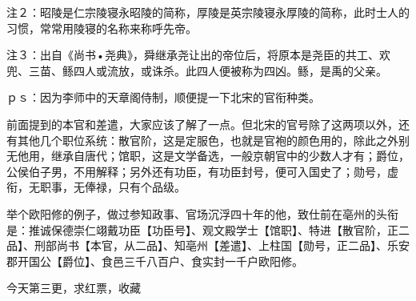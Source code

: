 注２：昭陵是仁宗陵寝永昭陵的简称，厚陵是英宗陵寝永厚陵的简称，此时士人的习惯，常常用陵寝的名称来称呼先帝。

注３：出自《尚书•尧典》，舜继承尧让出的帝位后，将原本是尧臣的共工、欢兜、三苗、鲧四人或流放，或诛杀。此四人便被称为四凶。鲧，是禹的父亲。

ｐｓ：因为李师中的天章阁侍制，顺便提一下北宋的官衔种类。

前面提到的本官和差遣，大家应该了解了一点。但北宋的官号除了这两项以外，还有其他几个职位系统：散官阶，这是定服色，也就是官袍的颜色用的，除此之外别无他用，继承自唐代；馆职，这是文学备选，一般京朝官中的少数人才有；爵位，公侯伯子男，不用解释；另外还有功臣，有功臣封号，便可入国史了；勋号，虚衔，无职事，无俸禄，只有个品级。

举个欧阳修的例子，做过参知政事、官场沉浮四十年的他，致仕前在亳州的头衔是：推诚保德崇仁翊戴功臣【功臣号】、观文殿学士【馆职】、特进【散官阶，正二品】、刑部尚书【本官，从二品】、知亳州【差遣】、上柱国【勋号，正二品】、乐安郡开国公【爵位】、食邑三千八百户、食实封一千户欧阳修。

今天第三更，求红票，收藏

